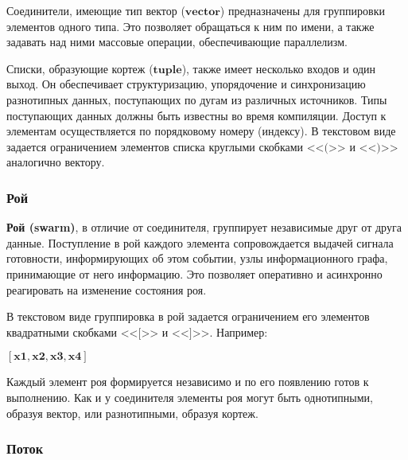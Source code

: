 Соединители, имеющие тип вектор ($\mathbf{vector}$) предназначены для группировки элементов одного типа. Это позволяет обращаться к ним по имени, а также задавать над ними массовые операции, обеспечивающие параллелизм.

Списки, образующие кортеж ($\mathbf{tuple}$), также имеет несколько входов и один выход. Он обеспечивает структуризацию, упорядочение и синхронизацию разнотипных данных, поступающих по дугам из различных источников. Типы поступающих данных должны быть известны во время компиляции. Доступ к элементам осуществляется по порядковому номеру (индексу). В текстовом виде задается ограничением элементов списка круглыми скобками <<$\mathbf{(}$>> и <<$\mathbf{)}$>> аналогично вектору.


\subsubsection{Рой}

\textbf{Рой (swarm)}, в отличие от соединителя, группирует независимые друг от друга данные. Поступление в рой каждого элемента сопровождается выдачей сигнала готовности, информирующих об этом событии, узлы информационного графа, принимающие от него информацию. Это позволяет оперативно и асинхронно реагировать на изменение состояния роя.

В текстовом виде группировка в рой задается ограничением его элементов квадратными скобками <<$\mathbf{[}$>> и <<$\mathbf{]}$>>. Например:
\begin{center}
	$\mathbf{[x1, x2, x3, x4]}$
\end{center}
Каждый элемент роя формируется независимо и по его появлению готов к выполнению. Как и у соединителя элементы роя могут быть однотипными, образуя вектор, или разнотипными, образуя кортеж.

\subsubsection{Поток}

